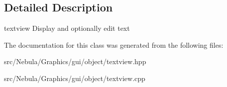 \subsection{\-Detailed \-Description}
textview \-Display and optionally edit text 

\-The documentation for this class was generated from the following files\-:\begin{DoxyCompactItemize}
\item 
src/\-Nebula/\-Graphics/gui/object/textview.\-hpp\item 
src/\-Nebula/\-Graphics/gui/object/textview.\-cpp\end{DoxyCompactItemize}
